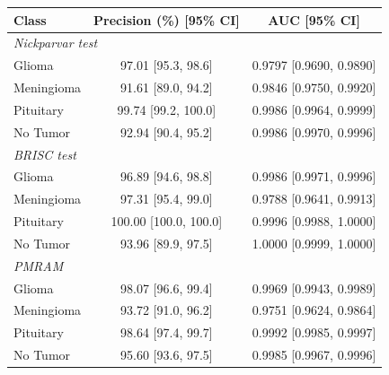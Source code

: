 \begin{tabular}{l c c}
\toprule
\textbf{Class} & \textbf{Precision (\%) [95\% CI]} & \textbf{AUC [95\% CI]} \\
\midrule
\multicolumn{3}{l}{\textit{Nickparvar test}} \\
\quad Glioma & 97.01 [95.3, 98.6] & 0.9797 [0.9690, 0.9890] \\
\quad Meningioma & 91.61 [89.0, 94.2] & 0.9846 [0.9750, 0.9920] \\
\quad Pituitary & 99.74 [99.2, 100.0] & 0.9986 [0.9964, 0.9999] \\
\quad No Tumor & 92.94 [90.4, 95.2] & 0.9986 [0.9970, 0.9996] \\
\multicolumn{3}{l}{\textit{BRISC test}} \\
\quad Glioma & 96.89 [94.6, 98.8] & 0.9986 [0.9971, 0.9996] \\
\quad Meningioma & 97.31 [95.4, 99.0] & 0.9788 [0.9641, 0.9913] \\
\quad Pituitary & 100.00 [100.0, 100.0] & 0.9996 [0.9988, 1.0000] \\
\quad No Tumor & 93.96 [89.9, 97.5] & 1.0000 [0.9999, 1.0000] \\
\multicolumn{3}{l}{\textit{PMRAM}} \\
\quad Glioma & 98.07 [96.6, 99.4] & 0.9969 [0.9943, 0.9989] \\
\quad Meningioma & 93.72 [91.0, 96.2] & 0.9751 [0.9624, 0.9864] \\
\quad Pituitary & 98.64 [97.4, 99.7] & 0.9992 [0.9985, 0.9997] \\
\quad No Tumor & 95.60 [93.6, 97.5] & 0.9985 [0.9967, 0.9996] \\
\bottomrule
\end{tabular}
